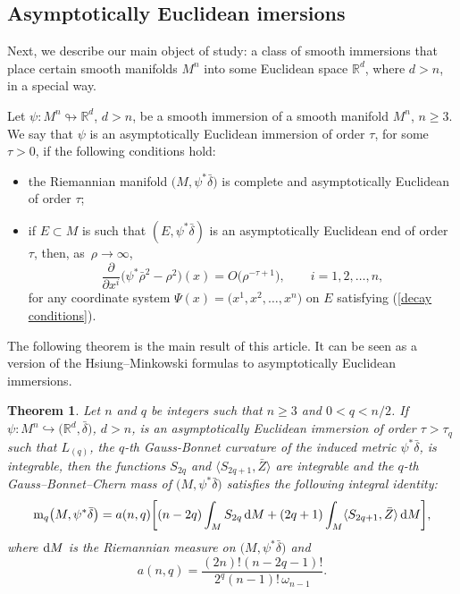 \documentclass[pdftex]{sigma}
\numberwithin{equation}{section}
\newtheorem{Theorem}{Theorem}[section]
\begin{document}
\subsection{Asymptotically Euclidean imersions}


Next, we describe our main object of study: a class of smooth immersions
that place certain smooth manifolds \(M^n\) into some Euclidean space
\(\mathbb{R}^d\), where \(d > n\), in a special way.

\begin{Definition} \label{defn AE}
 Let \({\psi\colon M^n \looparrowright \mathbb{R}^d}\), \(d > n\), be a smooth
 immersion of a smooth manifold \(M^n\), \(n \geq 3\). We say that
 \(\psi\) is an asymptotically Euclidean immersion of order \(\tau\), for some
 \(\tau > 0\), if the following conditions hold:
\begin{itemize}\itemsep=0pt
  \item[(i)] the Riemannian manifold $\bigl(M,\psi^*{\bar{\delta}}\bigr)$ is complete and asymptotically Euclidean of order $\tau$;
  \item[(ii)] if $E \subset M$ is such that $(E,\psi^*{\bar{\delta}})$ is an asymptotically Euclidean end of order \(\tau\), then, as~${\rho \to \infty}$,
  \[\frac{\partial}{\partial x^i}\bigl( \psi^\ast\bar{\rho}^2 - \rho^2 \bigr)(x) = O\bigl(\rho^{-\tau+1}\bigr), \qquad i=1,2, \ldots, n,\]
  for any coordinate system $\Psi(x) = \bigl(x^1, x^2, \ldots, x^n\bigr)$ on $E$ satisfying (\ref{decay conditions}).
\end{itemize}
\end{Definition}

The following theorem is the main result of this article. It can be seen as a version of the Hsiung--Minkowski formulas \cite{Hsiungintegralformulasclosed1956,KwongExtensionHsiungMinkowski2016} to asymptotically Euclidean immersions.

\begin{Theorem} \label{main theorem}
 Let $n$ and $q$ be integers such that $n \geq 3$ and $0 < q < n/2$.
 If $\psi\colon  M^n \hookrightarrow \bigl(\mathbb{R}^d, \bar{\delta}\bigr)$, $d > n$, is an
 asymptotically Euclidean immersion of order $\tau > \tau_q$ such that
 \(L_{(q)}\), the $q$-th Gauss-Bonnet curvature of the induced metric
 \(\psi^{\ast}\bar{\delta}\), is integrable, then the functions $S_{2q}$
 and $\bigl\langle S_{2q+1},\bar{Z} \bigr\rangle$ are integrable
 and the $q$-th Gauss--Bonnet--Chern mass of $\bigl(M, \psi^\ast\bar{\delta}\bigr)$ satisfies
 the following integral identity:
 \begin{equation*}
  \mathrm{m}_q\bigl(M,\psi^*\bar{\delta}\bigr) = a(n,q) \biggl[
   (n-2q) \int_M S_{2q} \, {\rm d}M
   + (2q+1) \int_M \langle S_{2q+1}, \bar{Z} \rangle \, {\rm d}M \biggr],
 \end{equation*}
 where \({\rm d}M\) is the Riemannian measure on \(\bigl(M, \psi^{\ast}\bar{\delta}\bigr)\) and
 \begin{equation*}
  a(n,q) = \frac{(2n)!(n-2q-1)!}{2^q(n-1)! \, \omega_{n-1}}.
 \end{equation*}
\end{Theorem}
\end{document}
